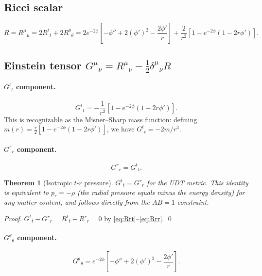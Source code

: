 \documentclass[11pt,letterpaper]{article}
\newtheorem{theorem}{Theorem}[section]
\numberwithin{equation}{section}
\begin{document}
\subsection{Ricci scalar}
\begin{equation}
\label{eq:ricci_scalar}
  R = R^\mu{}_\mu = 2R^t{}_t + 2R^\theta{}_\theta
    = 2e^{-2\phi}\!\left[-\phi'' + 2(\phi')^2 - \frac{2\phi'}{r}\right]
      + \frac{2}{r^2}\!\left[1 - e^{-2\phi}(1-2r\phi')\right].
\end{equation}

\subsection{Einstein tensor $G^\mu{}_\nu = R^\mu{}_\nu - \frac{1}{2}\delta^\mu{}_\nu R$}

\paragraph{$G^t{}_t$ component.}
\begin{equation}
\label{eq:Gtt}
\boxed{
  G^t{}_t = -\frac{1}{r^2}\!\left[1 - e^{-2\phi}\!\left(1 - 2r\phi'\right)\right].
}
\end{equation}
This is recognizable as the Misner--Sharp mass function: defining
$m(r) = \frac{r}{2}[1-e^{-2\phi}(1-2r\phi')]$, we have $G^t{}_t = -2m/r^3$.

\paragraph{$G^r{}_r$ component.}
\begin{equation}
\label{eq:Grr}
  G^r{}_r = G^t{}_t.
\end{equation}

\begin{theorem}[Isotropic $t$-$r$ pressure]
\label{thm:isotropic}
$G^t{}_t = G^r{}_r$ for the UDT metric. This identity is equivalent to
$p_r = -\rho$ (the radial pressure equals minus the energy density) for any
matter content, and follows directly from the $AB=1$ constraint.
\end{theorem}

\textit{Proof.}
$G^t{}_t - G^r{}_r = R^t{}_t - R^r{}_r = 0$ by \eqref{eq:Rtt}--\eqref{eq:Rrr}. \qed

\paragraph{$G^\theta{}_\theta$ component.}
\begin{equation}
\label{eq:Gthth}
\boxed{
  G^\theta{}_\theta = e^{-2\phi}\!\left[-\phi'' + 2(\phi')^2 - \frac{2\phi'}{r}\right].
}
\end{equation}
\end{document}
